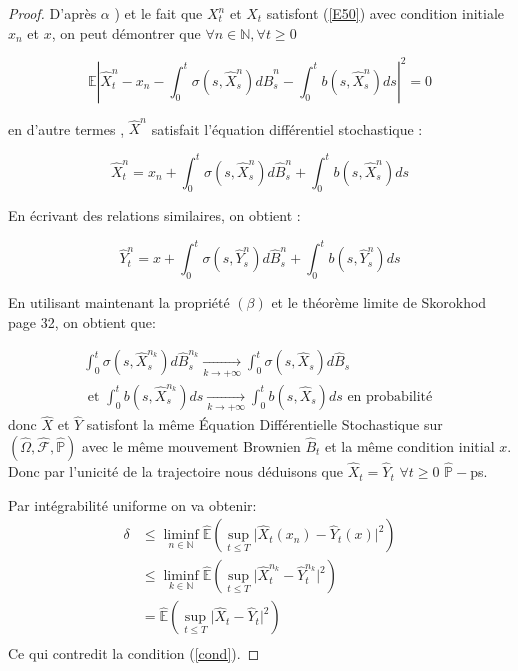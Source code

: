 \documentclass[A4paper,12pt]{report}
\newcommand{\N}{{\mathbb{N}}}
\newcommand{\E}{{\mathbb{E}}}
\newcommand{\pr}{{\mathbb{P}}}
\begin{document}
\begin{proof}
D'après $\alpha$ ) et le  fait que $X_{t}^{n}$ et $X_{t}$ satisfont (\ref{E50}) avec condition initiale $x_{n}$ et $x$, on peut démontrer que $\forall n \in \N, \forall t \geq 0$

$$
\E\left|\widehat{X}_{t}^{n}-x_{n}-\int_{0}^{t} \sigma\left(s, \widehat{X}_{s}^{n}\right) d \widehat{B}_{s}^{n}-\int_{0}^{t} b\left(s, \widehat{X}_{s}^{n}\right) d s\right|^{2}=0
$$

en d'autre termes , $\widehat{X}^{n}$ satisfait l'équation différentiel stochastique  :

$$
\widehat{X}_{t}^{n}=x_{n}+\int_{0}^{t} \sigma\left(s, \widehat{X}_{s}^{n}\right) d \widehat{B}_{s}^{n}+\int_{0}^{t} b\left(s, \widehat{X}_{s}^{n}\right) d s
$$

En écrivant des relations similaires, on obtient :

$$
\widehat{Y}_{t}^{n}=x+\int_{0}^{t} \sigma\left(s, \widehat{Y}_{s}^{n}\right) d \widehat{B}_{s}^{n}+\int_{0}^{t} b\left(s, \widehat{Y}_{s}^{n}\right) d s
$$

En utilisant maintenant la propriété $(\beta)$ et le théorème limite de Skorokhod \cite{Skoro} page 32, on obtient que:

$$
\begin{gathered}
\int_{0}^{t} \sigma\left(s, \widehat{X}_{s}^{n_{k}}\right) d \widehat{B}_{s}^{n_{k}} \underset{k \rightarrow+\infty}{\longrightarrow} \int_{0}^{t} \sigma\left(s, \widehat{X}_{s}\right) d \widehat{B}_{s} \\
\text { et } \int_{0}^{t} b\left(s, \widehat{X}_{s}^{n_{k}}\right) d s \underset{k \rightarrow+\infty}{\longrightarrow} \int_{0}^{t} b\left(s, \widehat{X}_{s}\right) d s  \text{ en probabilité }
\end{gathered}
$$
donc $\widehat{X}$ et $\widehat{Y}$ satisfont la même Équation Différentielle Stochastique sur $(\widehat{\Omega}, \widehat{\mathcal{F}}, \widehat{\pr})$ avec le même mouvement Brownien $\widehat{B}_t$ et la même condition initial $x$.\\
Donc par  l'unicité de la trajectoire nous déduisons que  $\widehat{X}_t =  \widehat{Y}_t$ $\forall t\geq 0$ $\widehat{\pr}-$ps.

Par intégrabilité uniforme on va obtenir:
\begin{align*}
\delta &\leq \liminf_{n \in \N} \widehat{\E} (\sup_{t\leq T} \lvert \widehat{X}_t(x_n) - \widehat{Y}_t (x)\rvert^2)\\
&\leq \liminf_{k \in \N} \widehat{\E} (\sup_{t\leq T} \lvert \widehat{X}_t ^{n_k} - \widehat{Y}_t ^{n_k} \rvert^2 )\\
&= \widehat{\E}(\sup_{t\leq T} \lvert \widehat{X}_t  - \widehat{Y}_t \rvert^2 )\\
\end{align*}
Ce qui contredit la condition (\ref{cond}).
\end{proof}
\end{document}
